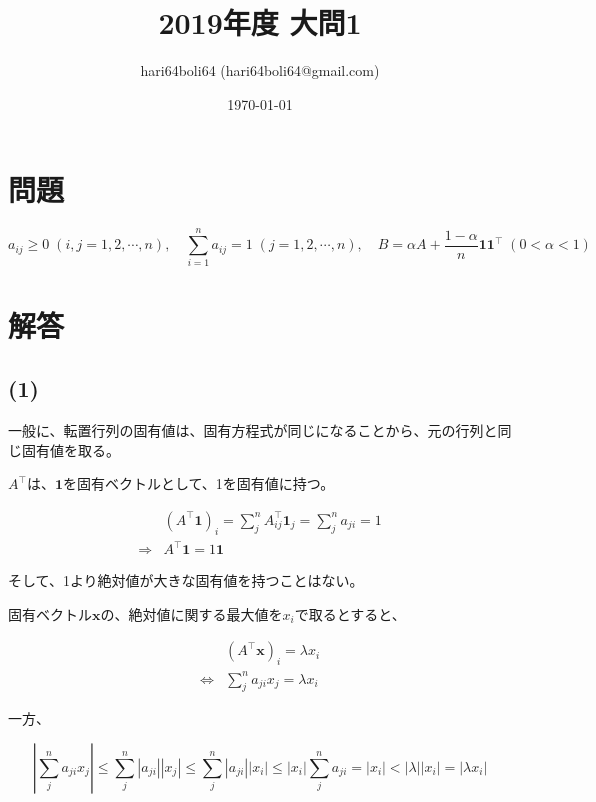 \documentclass[a4paper, 10pt, dvipdfmx]{jlreq}
\begin{document}
\title{2019年度 大問1}
\author{hari64boli64 (hari64boli64@gmail.com)}
\date{\today}
\maketitle


\section{問題}

\begin{equation*}
  a_{ij} \geq 0 \; (i,j = 1,2,\cdots,n), \quad \sum_{i=1}^{n}a_{ij}=1 \; (j=1,2,\cdots,n),  \quad B=\alpha A+\frac{1-\alpha}{n}\bm{1}\bm{1}^\top  \; (0<\alpha<1)
\end{equation*}

\section{解答}

\subsection*{(1)}

一般に、転置行列の固有値は、固有方程式が同じになることから、元の行列と同じ固有値を取る。

$A^\top $は、$\bm{1}$を固有ベクトルとして、1を固有値に持つ。

\begin{align*}
              & (A^\top \bm{1})_i=\sum_{j}^n A^\top _{ij}\bm{1}_j=\sum_{j}^n a_{ji}=1 \\
  \Rightarrow & A^\top \bm{1}=1\bm{1}
\end{align*}

そして、1より絶対値が大きな固有値を持つことはない。

固有ベクトル$\bm{x}$の、絶対値に関する最大値を$x_i$で取るとすると、

\begin{align*}
                  & (A^\top \bm{x})_i =\lambda x_i    \\
  \Leftrightarrow & \sum_{j}^n a_{ji}x_j =\lambda x_i
\end{align*}

一方、

\begin{equation*}
  \left|\sum_{j}^n a_{ji}x_j\right| \leq \sum_{j}^n |a_{ji}||x_j| \leq \sum_{j}^n |a_{ji}||x_i| \leq |x_i|\sum_{j}^n a_{ji} = |x_i| < |\lambda||x_i|=|\lambda x_i|
\end{equation*}
\end{document}

